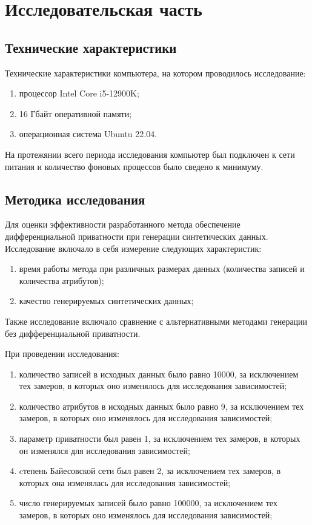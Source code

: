 \chapter{Исследовательская часть}

\section{Технические характеристики}

Технические характеристики компьютера, на котором проводилось исследование:
\begin{enumerate}[label*=---]
	\item процессор Intel Core i5-12900K;
	\item 16 Гбайт оперативной памяти;
	\item операционная система Ubuntu 22.04.
\end{enumerate}

На протежянии всего периода исследования компьютер был подключен к сети питания и количество фоновых процессов было сведено к минимуму.

\section{Методика исследования}

Для оценки эффективности разработанного метода обеспечение дифференциальной приватности при генерации синтетических данных.
Исследование включало в себя измерение следующих характеристик:
\begin{enumerate}[label*=---]
	\item время работы метода при различных размерах данных (количества записей и количества атрибутов);
	\item качество генерируемых синтетических данных;
\end{enumerate}
Также исследование включало сравнение с альтернативными методами генерации без дифференциальной приватности.

При проведении исследования:
\begin{enumerate}[label*=---]
	\item количество записей в исходных данных было равно 10000, за исключением тех замеров, в которых оно изменялось для исследования зависимостей;
	\item количество атрибутов в исходных данных было равно 9, за исключением тех замеров, в которых оно изменялось для исследования зависимостей;
	\item параметр приватности был равен 1, за исключением тех замеров, в которых он изменялся для исследования зависимостей;
	\item cтепень Байесовской сети был равен 2, за исключением тех замеров, в которых она изменялась для исследования зависимостей;
	\item число генерируемых записей было равно 100000, за исключением тех замеров, в которых оно изменялось для исследования зависимостей;
\end{enumerate}

